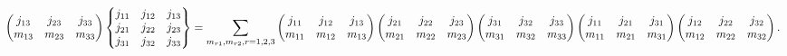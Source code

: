 \[\begin{pmatrix}j_{13}&j_{23}&j_{33}\\
m_{13}&m_{23}&m_{33}\end{pmatrix}\begin{Bmatrix}j_{11}&j_{12}&j_{13}\\
j_{21}&j_{22}&j_{23}\\
j_{31}&j_{32}&j_{33}\end{Bmatrix}=\sum_{m_{r1},m_{r2},r=1,2,3}\begin{pmatrix}j%
_{11}&j_{12}&j_{13}\\
m_{11}&m_{12}&m_{13}\end{pmatrix}\begin{pmatrix}j_{21}&j_{22}&j_{23}\\
m_{21}&m_{22}&m_{23}\end{pmatrix}\*\begin{pmatrix}j_{31}&j_{32}&j_{33}\\
m_{31}&m_{32}&m_{33}\end{pmatrix}\begin{pmatrix}j_{11}&j_{21}&j_{31}\\
m_{11}&m_{21}&m_{31}\end{pmatrix}\begin{pmatrix}j_{12}&j_{22}&j_{32}\\
m_{12}&m_{22}&m_{32}\end{pmatrix}.\]